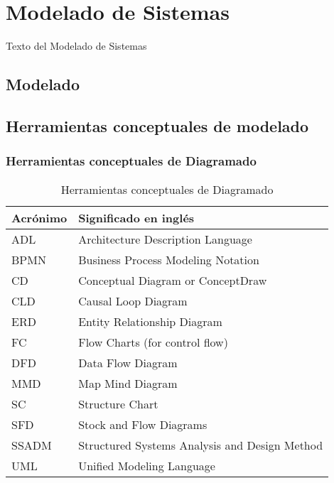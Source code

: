 
\chapter{Modelado de Sistemas}

Texto del Modelado de Sistemas

\section{Modelado}
\section{Herramientas conceptuales de modelado}

\subsection{Herramientas conceptuales de Diagramado}
\begin{table}[h]
\centering
\caption{Herramientas conceptuales de Diagramado}
\label{Herramientas-conceptuales-de-Diagramado}
\begin{tabular}{|l|l|}
\hline
Acrónimo & Significado en inglés                         \\ \hline
ADL      & Architecture Description Language             \\ \hline
BPMN     & Business Process Modeling Notation            \\ \hline
CD       & Conceptual Diagram or ConceptDraw             \\ \hline
CLD      & Causal Loop Diagram                           \\ \hline
ERD      & Entity Relationship Diagram                   \\ \hline
FC       & Flow Charts (for control flow)                \\ \hline
DFD      & Data Flow Diagram                             \\ \hline
MMD      & Map Mind Diagram                              \\ \hline
SC       & Structure Chart                               \\ \hline
SFD      & Stock and Flow Diagrams                       \\ \hline
SSADM    & Structured Systems Analysis and Design Method \\ \hline
UML      & Unified Modeling Language                     \\ \hline
\end{tabular}
\end{table}

